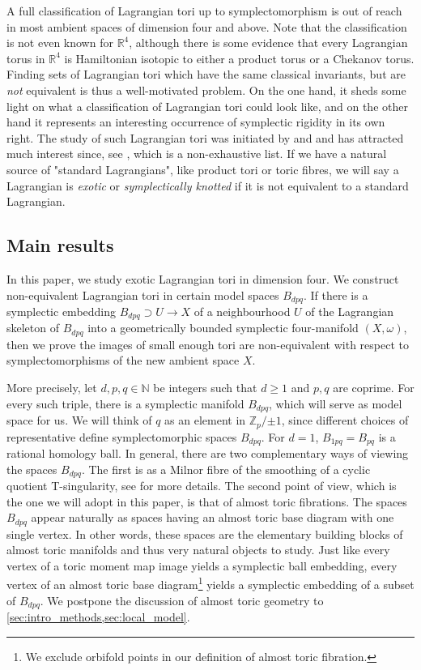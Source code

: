 \documentclass[12pt,a4paper,abstract=true,final]{scrartcl}
\begin{document}
A full classification of Lagrangian tori up to symplectomorphism is out of reach in most ambient spaces of dimension four and above.
Note that the classification is not even known for $\mathbb{R}^4$, although there is some evidence \cite{Riz19} that every Lagrangian torus in $\mathbb{R}^4$ is Hamiltonian isotopic to either a product torus or a Chekanov torus.
Finding sets of Lagrangian tori which have the same classical invariants, but are \emph{not} equivalent is thus a well-motivated problem.
On the one hand, it sheds some light on what a classification of Lagrangian tori could look like, and on the other hand it represents an interesting occurrence of symplectic rigidity in its own right.
The study of such Lagrangian tori was initiated by \cite{Che96} and \cite{EliPol97} and has attracted much interest since,  see \cite{Aur15, brendel2020real, CheSch10, FOOO12, GalMik22, SheTonVia19, Via17, Via16} , which is a non-exhaustive list.
If we have a natural source of "standard Lagrangians", like product tori or
toric fibres, we will say a Lagrangian is \emph{exotic} or \emph{symplectically knotted} if it is not equivalent to a standard Lagrangian.

\subsection{Main results}
\label{sec:intro_main_results}

In this paper, we study exotic Lagrangian tori in dimension four.
We construct non-equivalent Lagrangian tori in certain model spaces $B_{dpq}$. If there is a symplectic embedding $B_{dpq} \supset U \rightarrow X$ of a neighbourhood $U$ of the Lagrangian skeleton of $B_{dpq}$ into a geometrically bounded symplectic four-manifold $(X,\omega)$, then we prove the images of small enough tori are non-equivalent with respect to symplectomorphisms of the new ambient space $X$.

More precisely, let $d,p,q \in \mathbb{N}$ be integers such that $d≥1$ and $p,q$ are coprime.
For every such triple, there is a symplectic manifold $B_{dpq}$, which will serve as model space for us. 
We will think of $q$ as an element in $ℤ_p / {±1}$, since different choices of representative define symplectomorphic spaces $B_{dpq}$.
For $d=1$, $B_{1pq} = B_{pq}$ is a rational homology ball.
In general, there are two complementary ways of viewing the spaces $B_{dpq}$.
The first is as a Milnor fibre of the smoothing of a cyclic quotient T-singularity, see \cite[Section 7.4]{evans2021atfs} for more details.
The second point of view, which is the one we will adopt in this paper, is that of almost toric fibrations.
The spaces $B_{dpq}$ appear naturally as spaces having an almost toric base diagram with one single vertex.
In other words, these spaces are the elementary building blocks of almost toric manifolds and thus very natural objects to study.
Just like every vertex of a toric moment map image yields a symplectic ball embedding, every vertex of an almost toric base diagram\footnote{We exclude orbifold points in our definition of almost toric fibration.} yields a symplectic embedding of a subset of $B_{dpq}$.
We postpone the discussion of almost toric geometry to \cref{sec:intro_methods,sec:local_model}. 
\end{document}
